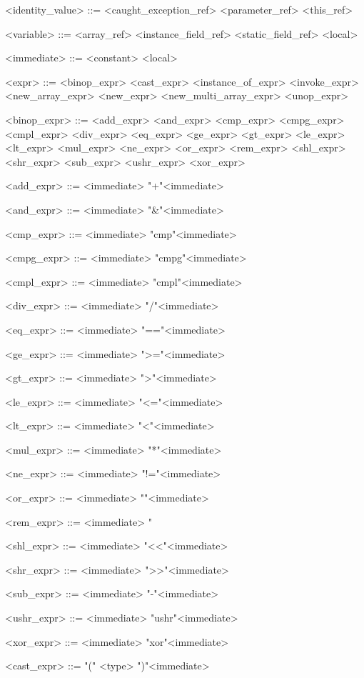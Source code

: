 \documentclass{report}
\begin{document}
\begin{grammar}
<identity_value> ::= <caught_exception_ref> \alt <parameter_ref> \alt <this_ref>

<variable> ::= <array_ref> \alt <instance_field_ref> \alt <static_field_ref> \alt <local>

<immediate> ::= <constant> \alt <local>

<expr> ::= <binop_expr> \alt <cast_expr> \alt <instance_of_expr> \alt <invoke_expr> \alt <new_array_expr> \alt <new_expr> \alt <new_multi_array_expr> \alt <unop_expr>

<binop_expr> ::= <add_expr> \alt <and_expr> \alt <cmp_expr> \alt <cmpg_expr> \alt <cmpl_expr> \alt <div_expr> \alt <eq_expr> \alt <ge_expr> \alt <gt_expr> \alt <le_expr> \alt <lt_expr> \alt <mul_expr> \alt <ne_expr> \alt <or_expr> \alt <rem_expr> \alt <shl_expr> \alt <shr_expr> \alt <sub_expr> \alt <ushr_expr> \alt <xor_expr>

<add_expr> ::= <immediate> "+"<immediate>

<and_expr> ::= <immediate> "&"<immediate>

<cmp_expr> ::= <immediate> "cmp"<immediate>

<cmpg_expr> ::= <immediate> "cmpg"<immediate>

<cmpl_expr> ::= <immediate> "cmpl"<immediate>

<div_expr> ::= <immediate> "/"<immediate>

<eq_expr> ::= <immediate> "=="<immediate>

<ge_expr> ::= <immediate> ">="<immediate>

<gt_expr> ::= <immediate> ">"<immediate>

<le_expr> ::= <immediate> "<="<immediate>

<lt_expr> ::= <immediate> "<"<immediate>

<mul_expr> ::= <immediate> "*"<immediate>

<ne_expr> ::= <immediate> "!="<immediate>

<or_expr> ::= <immediate> "\alt"<immediate>

<rem_expr> ::= <immediate> "%

<shl_expr> ::= <immediate> "<<"<immediate>

<shr_expr> ::= <immediate> ">>"<immediate>

<sub_expr> ::= <immediate> "-"<immediate>

<ushr_expr> ::= <immediate> "ushr"<immediate>

<xor_expr> ::= <immediate> "xor"<immediate>

<cast_expr> ::= "(" <type> ")"<immediate>


\end{grammar}
\end{document}
